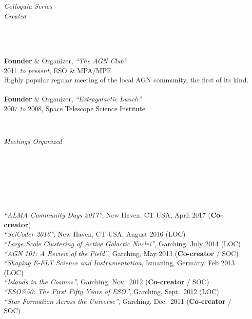 \documentclass[11pt]{article}
\begin{document}
\hspace{2.5mm} \parbox{1.5in}{{\it Colloquia Series \\ Created\\\\\\\\} } \parbox{5.15in}{
{\bf Founder} \& Organizer, {\it ``The AGN Club''}  \\ 2011 {\it to present},  ESO \& MPA/MPE \\ Highly popular regular meeting of the local AGN community, the first of its kind. \\\\
{\bf Founder} \& Organizer, {\it ``Extragalactic Lunch''} \\
2007 {\it to} 2008, Space Telescope Science Institute} \\


\vspace{4mm}



\hspace{2.5mm} \parbox{1.5in}{{\it Meetings Organized} \\\\\\\\\\\\\\} \parbox{5.15in}{
\textit{``ALMA Community Days 2017''}, New Haven, CT USA, April 2017 (\textbf{Co-creator}) \\
{\it ``SciCoder 2016''}, New Haven, CT USA, August 2016 (LOC)\\
{\it ``Large Scale Clustering of Active Galactic Nuclei''}, Garching, July 2014 (LOC)\\  
{\it ``AGN 101: A Review of the Field''}, Garching, May 2013 ({\bf  Co-creator} / SOC)\\
{\it ``Shaping E-ELT Science and Instrumentation}, Ismaning, Germany, Feb 2013 (LOC)\\
{\it ``Islands in the Cosmos''}, Garching, Nov.~2012 ({\bf  Co-creator} / SOC)\\
{\it ``ESO@50: The First Fifty Years of ESO''}, Garching, Sept.~2012  (LOC)\\
{\it ``Star Formation Across the Universe''}, Garching, Dec.~2011 ({\bf  Co-creator} / SOC)
}


\vspace{4mm}
\end{document}

